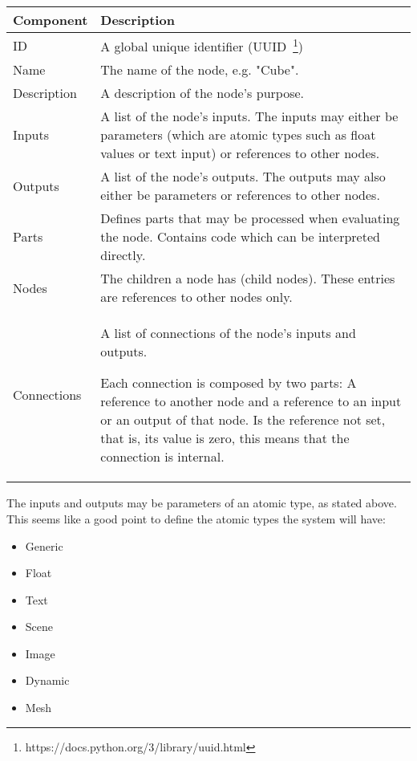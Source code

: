 \documentclass[
    a4paper,      %
    10pt,         %
    openright,    %
    notitlepage,  %
    parskip=half, %
]{scrreprt}       %
\newcommand{\ra}[1]{\renewcommand{\arraystretch}{#1}}
\theoremstyle{definition}                    %
\begin{document}
\begin{table*}\centering
  \ra{1.3}
  \begin{tabularx}{\textwidth}{@{}lX@{}}
    \toprule
    Component & Description \\
    \hline
    ID & A global unique identifier
         (UUID~\footnote{https://docs.python.org/3/library/uuid.html}) \\
    Name & The name of the node, e.g. "Cube". \\
    Description & A description of the node's purpose. \\
    Inputs & A list of the node's inputs. The inputs may either be parameters
             (which are atomic types such as float values or text input) or
             references to other nodes. \\
    Outputs & A list of the node's outputs. The outputs may also either be
              parameters or references to other nodes. \\
    Parts & Defines parts that may be processed when evaluating the node.
            Contains code which can be interpreted directly. \\
    Nodes & The children a node has (child nodes). These entries are
            references to other nodes only. \\
    Connections & A list of connections of the node's inputs and outputs.

                  Each connection is composed by two parts: A reference to another
                  node and a reference to an input or an output of that node. Is
                  the reference not set, that is, its value is zero, this means
                  that the connection is internal. \\
    \bottomrule
  \end{tabularx}
\end{table*}

The inputs and outputs may be parameters of an atomic type, as stated above. This
seems like a good point to define the atomic types the system will have:

\begin{itemize}
  \item{Generic}
  \item{Float}
  \item{Text}
  \item{Scene}
  \item{Image}
  \item{Dynamic}
  \item{Mesh}
\end{itemize}
\end{document}
